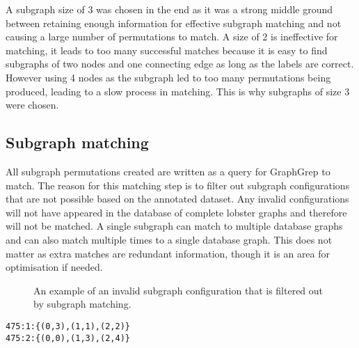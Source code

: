 \noindent
A subgraph size of 3 was chosen in the end as it was a strong middle ground between retaining enough information for effective subgraph matching and not causing a large number of permutations to match. A size of 2 is ineffective for matching, it leads to too many successful matches because it is easy to find subgraphs of two nodes and one connecting edge as long as the labels are correct. However using 4 nodes as the subgraph led to too many permutations being produced, leading to a slow process in matching. This is why subgraphs of size 3 were chosen.


\subsection{Subgraph matching}
All subgraph permutations created are written as a query for GraphGrep to match. The reason for this matching step is to filter out subgraph configurations that are not  possible based on the annotated dataset. Any invalid configurations will not have appeared in the database of complete lobster graphs and therefore will not be matched. A single subgraph can match to multiple database graphs and can also match multiple times to a single database graph. This does not matter as extra matches are redundant information, though it is an area for optimisation if needed. 
\begin{figure}[H]
\centering
{}
\caption{An example of an invalid subgraph configuration that is filtered out by subgraph matching.}
\end{figure}

\begin{lstlisting}[caption={Example of matching output from GraphGrep, which specifies the graph ids that were matched and which node from the query corresponded to which node from the database graph.}]
475:1:{(0,3),(1,1),(2,2)}
475:2:{(0,0),(1,3),(2,4)}
\end{lstlisting}

